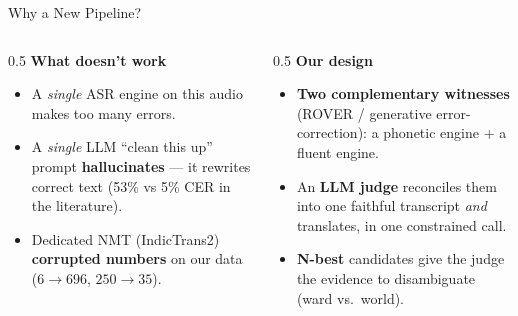 \documentclass[aspectratio=169,10pt]{beamer}
\begin{document}
\begin{frame}{Why a New Pipeline?}
  \begin{columns}[T]
    \begin{column}{0.5\textwidth}
      \textbf{What doesn't work}
      \begin{itemize}
        \item A \emph{single} ASR engine on this audio makes too many errors.
        \item A \emph{single} LLM ``clean this up'' prompt \textbf{hallucinates}
              --- it rewrites correct text (53\% vs 5\% CER in the literature).
        \item Dedicated NMT (IndicTrans2) \textbf{corrupted numbers} on our
              data ($6\to696$, $250\to35$).
      \end{itemize}
    \end{column}
    \begin{column}{0.5\textwidth}
      \textbf{Our design}
      \begin{itemize}
        \item \textbf{Two complementary witnesses} (ROVER / generative
              error-correction): a phonetic engine + a fluent engine.
        \item An \textbf{LLM judge} reconciles them into one faithful
              transcript \emph{and} translates, in one constrained call.
        \item \textbf{N-best} candidates give the judge the evidence to
              disambiguate (ward vs.\ world).
      \end{itemize}
    \end{column}
  \end{columns}
\end{frame}
\end{document}
